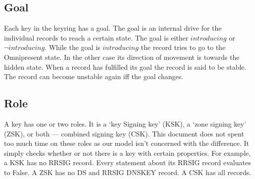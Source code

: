 \documentclass[twoside, a4paper]{article}
\begin{document}
\subsection{Goal}

Each key in the keyring has a goal. The goal is an internal drive 
for the individual records to reach a certain state. The goal is 
either $introducing$ or $\neg introducing$. While the goal is 
$introducing$ the record tries to go to the Omnipresent state. In 
the other case its direction of movement is towards the hidden 
state. When a record has fulfilled its goal the record is said to be 
stable. The record can become unstable again iff the goal changes.

\subsection{Role}

A key has one or two roles. It is a `key Signing key' (KSK), a `zone 
signing key' (ZSK), or both --- combined signing key (CSK). This 
document does not spent too much time on these roles as our model 
isn't concerned with the difference. It simply checks whether or not 
there is a key with certain properties. For example, a KSK has no 
RRSIG record. Every statement about its RRSIG record evaluates to 
False. A ZSK has no DS and RRSIG DNSKEY record. A CSK has all records.
\end{document}
